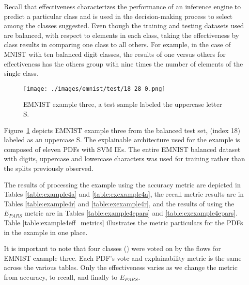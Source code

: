 Recall that effectiveness characterizes the performance of an inference engine
to predict a particular class and is used in the decision-making process to
select among the classes suggested. Even though the training and testing
datasets used are balanced, with respect to elements in each class, taking the
effectiveness by class results in comparing one class to all others. For
example, in the case of MNIST with ten balanced digit classes, the results of
one versus others for effectiveness has the others group with nine times the
number of elements of the single class.

\begin{figure}[H]
    \centering
    \texttt{[image: ./images/emnist/test/18\_28\_0.png]}
    \caption{EMNIST example three, a test sample labeled the uppercase letter S.}
    \label{fig:ex4}
\end{figure}

Figure~\ref{fig:ex4} depicts EMNIST example three from the balanced test set,
(index 18) labeled as an uppercase S. The explainable architecture used for the
example is composed of eleven PDFs with SVM IEs. The entire EMNIST balanced
dataset with digits, uppercase and lowercase characters was used for training
rather than the splits previously observed.

The results of processing the example using the accuracy metric are
depicted in Tables \ref{table:example4a} and \ref{table:exexample4a}, the recall
metric results are in Tables \ref{table:example4r} and \ref{table:exexample4r},
and the results of using the $E_{PARS}$ metric are in Tables
\ref{table:example4epars} and \ref{table:exexample4epars}.  Table
\ref{table:example4eff_metrics} illustrates the metric particulars for the PDFs
in the example in one place.

It is important to note that four classes () were voted on by the flows for EMNIST
example three.  Each PDF's vote and explainability metric is the same across the
various tables. Only the effectiveness varies as we change the metric from
accuracy, to recall, and finally to $E_{PARS}$.

